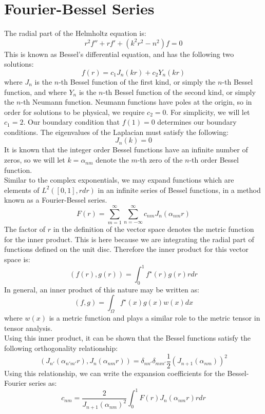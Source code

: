 \documentclass{paper}
\begin{document}
\section{Fourier-Bessel Series}
The radial part of the Helmholtz equation is:
\begin{equation}
  r^2 f''+ rf' + (k^2 r^2 - n^2) f = 0
\end{equation}
This is known as Bessel's differential equation, and has the following two solutions:
\begin{equation}
  f(r) = c_1 J_n(k r) + c_2 Y_n (k r)
\end{equation}
where $J_n$ is the $n$-th Bessel function of the first kind, or simply the $n$-th Bessel function, and where $Y_n$ is the $n$-th Bessel function of the second kind, or simply the $n$-th Neumann function. Neumann functions have poles at the origin, so in order for solutions to be physical, we require $c_2 = 0$. For simplicity, we will let $c_1 = 2$. Our boundary condition that $f(1)= 0$ determines our boundary conditions. The eigenvalues of the Laplacian must satisfy the following:
\begin{equation}
  \boxed{
    J_n(k) = 0
  }
\end{equation}
It is known that the integer order Bessel functions have an infinite number of zeros, so we will let $k = \alpha_{nm}$ denote the $m$-th zero of the $n$-th order Bessel function.\\
Similar to the complex exponentials, we may expand functions which are elements of $L^2([0,1],rdr)$ in an infinite series of Bessel functions, in a method known as a Fourier-Bessel series.
\begin{equation}
  F(r) = \sum_{m = 1}^{\infty} \sum_{n = -\infty}^\infty c_{nm} J_n(\alpha_{nm} r)
\end{equation}
The factor of $r$ in the definition of the vector space denotes the metric function for the inner product. This is here because we are integrating the radial part of functions defined on the unit disc. Therefore the inner product for this vector space is:
\begin{equation}
  (f(r),g(r)) = \int_0^1 f^\star(r)g(r)r dr
\end{equation}
In general, an inner product of this nature may be written as:
\begin{equation}
  (f,g) = \int_\Omega f^\star (x) g(x) w(x)dx
\end{equation}
where $w(x)$ is a metric function and plays a similar role to the metric tensor in tensor analysis.\\
Using this inner product, it can be shown that the Bessel functions satisfy the following orthogonality relationship:
\begin{equation}
  \boxed{
    \left(J_{n'}(\alpha_{n'm'}r),J_{n}(\alpha_{nm}r)\right) =\delta_{nn'}\delta_{mm'}\frac{1}{2}(J_{n+1}(\alpha_{nm}))^2
  }
\end{equation}
Using this relationship, we can write the expansion coefficients for the Bessel-Fourier series as:
\begin{equation}
  \boxed{
    c_{nm} = \frac{2}{J_{n+1}(\alpha_{nm})^2}\int_0^1 F(r)J_n(\alpha_{nm}r) rdr
  }
\end{equation}
\end{document}
